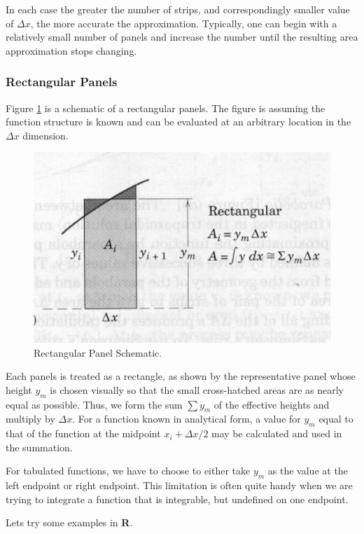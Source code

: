 In each case the greater the number of strips, and correspondingly smaller value of $\Delta x$, the more accurate the approximation. 
Typically, one can begin with a relatively small number of panels and increase the number until the resulting area approximation stops changing.

\subsubsection{Rectangular Panels}
Figure \ref{fig:RectangularPanels} is a schematic of a rectangular panels.  The figure is assuming the function structure is known and can be evaluated at an arbitrary location in the $\Delta x$ dimension.  
\begin{figure}[h!] %
   \centering
   \includegraphics[width=5in]{./3-Differentation/RectangularPanels.jpg} 
   \caption{Rectangular Panel Schematic.}
   \label{fig:RectangularPanels}
\end{figure}
Each panels is treated as a rectangle, as shown by the representative panel whose height $y_m$ is chosen visually so that the small cross-hatched areas are as nearly equal as possible. Thus, we form the sum $\sum y_m$ of the effective heights and multiply by $\Delta x$. For a function known in analytical form, a value for $y_m$ equal to that of the function at the midpoint $x_i + \Delta x /2$ may be calculated and used in the summation.

For tabulated functions, we have to choose to either take $y_m$ as the value at the left endpoint or right endpoint.    This limitation is often quite handy when we are trying to integrate a function that is integrable, but undefined on one endpoint.

Lets try some examples in \textbf{R}.\\

